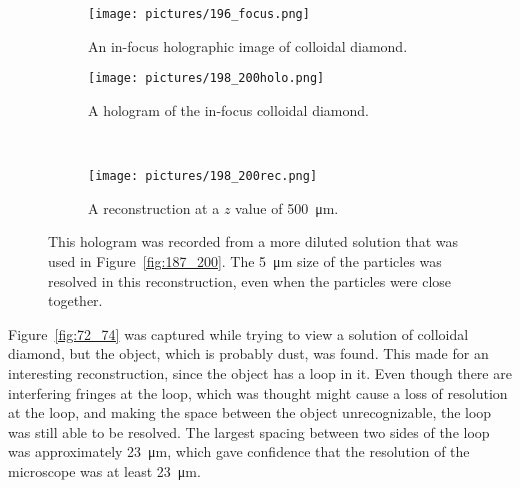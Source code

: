 \clearpage


\begin{figure}[ht!]
    \begin{center}

        \begin{subfigure}[t]{0.4\textwidth}
            \label{fig:196_focus}
            \texttt{[image: pictures/196\_focus.png]}
            \caption{An in-focus holographic image of colloidal diamond.}
        \end{subfigure}
                \hspace*{\fill}
        \begin{subfigure}[t]{0.4\textwidth}
            \label{fig:198_200holo}
            \texttt{[image: pictures/198\_200holo.png]}
            \caption{A hologram of the in-focus colloidal diamond.}
        \end{subfigure}
        \\
        \begin{subfigure}[t]{\textwidth}
            \label{fig:198_200rec}
            \texttt{[image: pictures/198\_200rec.png]}
            \caption{A reconstruction at a $z$ value of \SI{500}{\micro\meter}.}
        \end{subfigure}


    \end{center}
    \caption{%
        This hologram was recorded from a more diluted solution that was used
        in
        Figure~\ref{fig:187_200}.
        The \SI{5}{\micro\meter} size of the
        particles was resolved in this reconstruction, even when the particles
        were close together.
    }%
    \label{fig:198_200}
\end{figure}



Figure~\ref{fig:72_74} was captured while trying to view a solution of
colloidal diamond, but the object, which is probably dust, was found. This made
for an interesting reconstruction, since the object has a loop in it. Even
though there are interfering fringes at the loop, which was thought might cause
a loss of resolution at the loop, and making the space between the object
unrecognizable, the loop was still able to be resolved. The largest spacing
between two sides of the loop was approximately \SI{23}{\micro\meter}, which
gave confidence that the resolution of the microscope was at least
\SI{23}{\micro\meter}.

